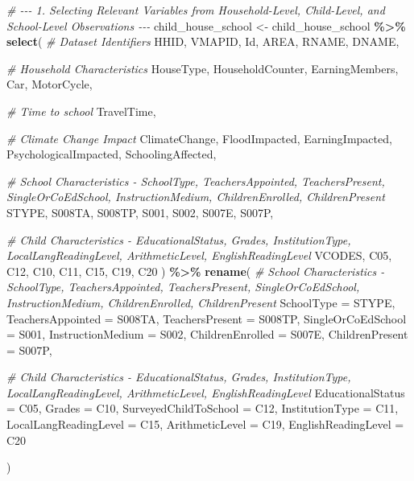 \documentclass[
]{article}
\newenvironment{Shaded}{\begin{snugshade}}{\end{snugshade}}
\newcommand{\AttributeTok}[1]{\textcolor[rgb]{0.13,0.29,0.53}{#1}}
\newcommand{\CommentTok}[1]{\textcolor[rgb]{0.56,0.35,0.01}{\textit{#1}}}
\newcommand{\FunctionTok}[1]{\textcolor[rgb]{0.13,0.29,0.53}{\textbf{#1}}}
\newcommand{\NormalTok}[1]{#1}
\newcommand{\OtherTok}[1]{\textcolor[rgb]{0.56,0.35,0.01}{#1}}
\newcommand{\SpecialCharTok}[1]{\textcolor[rgb]{0.81,0.36,0.00}{\textbf{#1}}}
\begin{document}
\begin{Shaded}
\begin{Highlighting}[]
\CommentTok{\# {-}{-}{-} 1. Selecting Relevant Variables from Household{-}Level, Child{-}Level, and School{-}Level Observations {-}{-}{-}}
\NormalTok{child\_house\_school }\OtherTok{\textless{}{-}}\NormalTok{ child\_house\_school }\SpecialCharTok{\%\textgreater{}\%} 
  \FunctionTok{select}\NormalTok{(}
    \CommentTok{\# Dataset Identifiers}
\NormalTok{    HHID, VMAPID, Id, AREA, RNAME, DNAME,}
    
    \CommentTok{\# Household Characteristics}
\NormalTok{    HouseType, HouseholdCounter, EarningMembers, Car, MotorCycle,}
    
    \CommentTok{\# Time to school}
\NormalTok{    TravelTime,}
    
    \CommentTok{\# Climate Change Impact}
\NormalTok{    ClimateChange, FloodImpacted, EarningImpacted, PsychologicalImpacted, SchoolingAffected,}
    
    \CommentTok{\# School Characteristics {-} SchoolType, TeachersAppointed, TeachersPresent, SingleOrCoEdSchool, InstructionMedium, ChildrenEnrolled, ChildrenPresent}
\NormalTok{    STYPE, S008TA, S008TP, S001, S002, S007E, S007P,}
    
    \CommentTok{\# Child Characteristics {-} EducationalStatus, Grades, InstitutionType, LocalLangReadingLevel, ArithmeticLevel, EnglishReadingLevel}
\NormalTok{    VCODES, C05, C12, C10, C11, C15, C19, C20}
\NormalTok{  ) }\SpecialCharTok{\%\textgreater{}\%}
  \FunctionTok{rename}\NormalTok{(}
    \CommentTok{\# School Characteristics {-} SchoolType, TeachersAppointed, TeachersPresent, SingleOrCoEdSchool, InstructionMedium, ChildrenEnrolled, ChildrenPresent}
    \AttributeTok{SchoolType =}\NormalTok{ STYPE, }\AttributeTok{TeachersAppointed =}\NormalTok{ S008TA, }\AttributeTok{TeachersPresent =}\NormalTok{ S008TP, }\AttributeTok{SingleOrCoEdSchool =}\NormalTok{ S001, }\AttributeTok{InstructionMedium =}\NormalTok{ S002, }\AttributeTok{ChildrenEnrolled =}\NormalTok{ S007E, }\AttributeTok{ChildrenPresent =}\NormalTok{ S007P,}
    
    \CommentTok{\# Child Characteristics {-} EducationalStatus, Grades, InstitutionType, LocalLangReadingLevel, ArithmeticLevel, EnglishReadingLevel}
    \AttributeTok{EducationalStatus =}\NormalTok{ C05, }\AttributeTok{Grades =}\NormalTok{ C10, }\AttributeTok{SurveyedChildToSchool =}\NormalTok{ C12, }\AttributeTok{InstitutionType =}\NormalTok{ C11, }\AttributeTok{LocalLangReadingLevel =}\NormalTok{ C15, }\AttributeTok{ArithmeticLevel =}\NormalTok{ C19, }\AttributeTok{EnglishReadingLevel =}\NormalTok{ C20}
  
\NormalTok{  )}
\end{Highlighting}
\end{Shaded}
\end{document}
